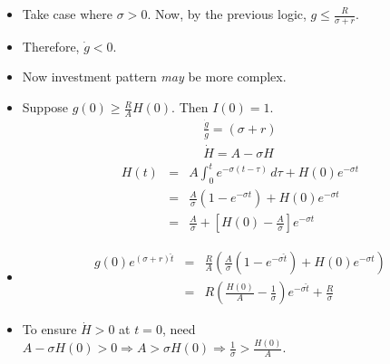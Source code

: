 \documentclass[12pt,compress,handout]{beamer}  %
\begin{document}
\begin{frame}
\begin{itemize}[<+->]
\item Take case where $\sigma > 0$. Now, by the previous logic, $g \leq
    \frac{R}{\sigma + r}$.
\item Therefore, $\dot{g} < 0$.

\item Now investment pattern \emph{may} be more complex.

\item Suppose $g(0) \geq \frac{R}{A}H(0)$. Then $I(0) = 1$.
  \begin{gather*}
    \frac{\dot{g}}{g} = (\sigma + r) \\
    \dot{H} = A - \sigma H
  \end{gather*}
  \begin{eqnarray*}
    H(t) &=& A \int_{0}^{t} e^{-\sigma (t - \tau)}\,d\tau + H(0)e^{-\sigma t} \\
     &=& \frac{A}{\sigma} (1 - e^{-\sigma t}) + H(0)e^{-\sigma t} \\
     &=& \frac{A}{\sigma} + \left[H(0) - \frac{A}{\sigma} \right] e^{-\sigma t}
  \end{eqnarray*}
\end{itemize}
\end{frame}


\begin{frame}
\begin{itemize}[<+->]
\item
  \begin{eqnarray*}
    g(0) e^{(\sigma + r)\hat{t}} &=& \frac{R}{A} \left( \frac{A}{\sigma}(1- e^{-\sigma \hat{t}}) + H(0)e^{-\sigma \hat{t}} \right) \\
     &=& R \left(\frac{H(0)}{A} - \frac{1}{\sigma} \right)e^{-\sigma \hat{t}} + \frac{R}{\sigma}
  \end{eqnarray*}

\item To ensure $\dot{H} > 0$ at $t=0$, need $A - \sigma H(0) >0
    \Rightarrow A > \sigma H(0) \Rightarrow \frac{1}{\sigma} >
    \frac{H(0)}{A}$.
\end{itemize}
\end{frame}
\end{document}
